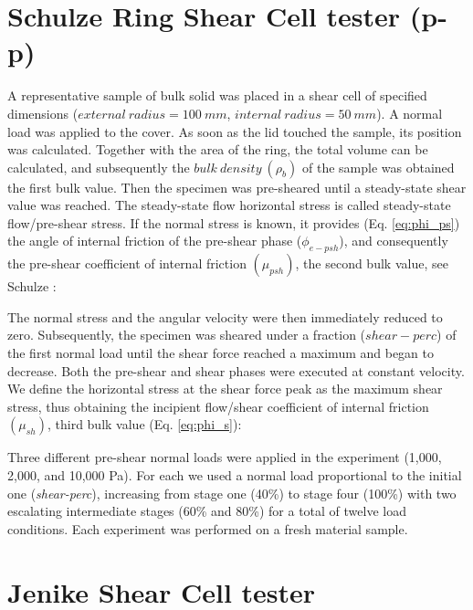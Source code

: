 \lipsum[1]



\section{Schulze Ring Shear Cell tester (p-p)}
\label{sec:SRSCT}

A representative sample of bulk solid was placed in a shear cell of specified
dimensions ($external ~ radius = 100 ~ mm$, $internal ~ radius = 50 ~ mm$).
A normal load was applied to the cover. As soon as the lid touched the sample,
its position was calculated.
Together with the area of the ring, the total volume can be calculated, and subsequently the $bulk ~ density ~ (\rho_b)$ 
of the sample was obtained the first bulk value.
Then the specimen was pre-sheared until a steady-state shear value was reached.
The steady-state flow horizontal stress
is called steady-state flow/pre-shear stress.
If the normal stress is known, it provides (Eq. \ref{eq:phi_ps}) the angle of
internal friction of the pre-shear phase ($\phi_{e-psh}$), and consequently the
pre-shear coefficient of internal friction $ (\mu_{psh})$, the second
bulk value, see Schulze \cite{RefWorks:118}:

The normal stress and the angular velocity were then immediately reduced to zero. 
Subsequently, the specimen was sheared under a fraction ($shear-perc$) of the first normal load until the shear force 
reached a maximum and began to decrease. 
Both the pre-shear and shear phases were executed at constant velocity. 
We define the horizontal stress at the shear force peak as the maximum shear
stress, thus obtaining the incipient flow/shear coefficient of internal friction $
(\mu_{sh})$, third bulk value (Eq. \ref{eq:phi_s})\cite{RefWorks:118}:

Three different pre-shear normal loads were applied in the experiment
(1,000, 2,000, and 10,000 Pa).
For each we used a normal load proportional to the initial one
(\textit{shear-perc}), increasing from stage one (40\%) to stage four (100\%)
with two escalating intermediate stages (60\% and 80\%) for a total of twelve load conditions.
Each experiment was performed on a fresh material sample. \\

\section{Jenike Shear Cell tester}
\label{sec:jsct}


